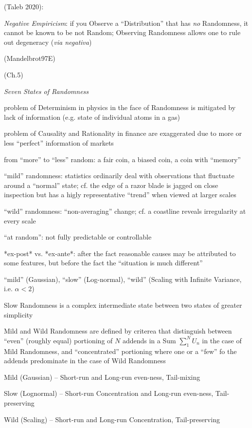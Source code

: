 (Taleb 2020):

\emph{Negative Empiricism}: if you Observe a ``Distribution'' that has \emph{no}
Randomness, it cannot be known to be not Random; Observing Randomness allows one
to rule out degeneracy (\emph{via negativa})

(Mandelbrot97E)

(Ch.5)

\emph{Seven States of Randomness}

problem of Determinism in physics in the face of Randomness is mitigated by lack
of information (e.g. state of individual atoms in a gas)

problem of Causality and Rationality in finance are exaggerated due to more or
less ``perfect'' information of markets

from ``more'' to ``less'' random: a fair coin, a biased coin, a coin with
``memory''

``mild'' randomness: statistics ordinarily deal with observations that fluctuate
around a ``normal'' state; cf. the edge of a razor blade is jagged on close
inspection but has a higly representative ``trend'' when viewed at larger scales

``wild'' randomness: ``non-averaging'' change; cf. a coastline reveals
irregularity at every scale

``at random'': not fully predictable or controllable

*ex-post* vs. *ex-ante*: after the fact reasonable causes may be attributed to
some features, but before the fact the ``situation is much different''

``mild'' (Gaussian), ``slow'' (Log-normal), ``wild'' (Scaling with Infinite
Variance, i.e. $\alpha < 2$)

Slow Randomness is a complex intermediate state between two states of greater
simplicity

Mild and Wild Randomness are defined by criterea that distinguish between
``even'' (roughly equal) portioning of $N$ addends in a Sum $\sum_1^N U_n$ in
the case of Mild Randomness, and ``concentrated'' portioning where one or a
``few'' fo the addends predominate in the case of Wild Randomness

Mild (Gaussian) -- Short-run and Long-run even-ness, Tail-mixing

Slow (Lognormal) -- Short-run Concentration and Long-run even-ness,
Tail-preserving

Wild (Scaling) -- Short-run and Long-run Concentration, Tail-preserving

